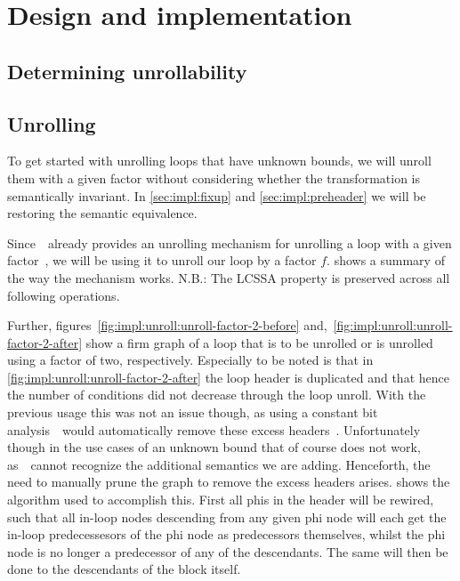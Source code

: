 \chapter{Design and implementation}\label{sec:impl}

\section{Determining unrollability}\label{sec:impl:unrollability}

\section{Unrolling}\label{sec:impl:unroll}

To get started with unrolling loops that have unknown bounds, we will unroll them with a given factor without considering whether the transformation is semantically invariant.
In \cref{sec:impl:fixup} and \cref{sec:impl:preheader} we will be restoring the semantic equivalence.

Since~\libFIRM~already provides an unrolling mechanism for unrolling a loop with a given factor~\cite{aebi18bachelorarbeit}, we will be using it to unroll our loop by a factor $f$.
 shows a summary of the way the mechanism works.
N.B.: The LCSSA property is preserved across all following operations.

Further, figures~\ref{fig:impl:unroll:unroll-factor-2-before} and,~\ref{fig:impl:unroll:unroll-factor-2-after} show a firm graph of a loop that is to be unrolled or is unrolled using a factor of two, respectively.
Especially to be noted is that in \cref{fig:impl:unroll:unroll-factor-2-after} the loop header is duplicated and that hence the number of conditions did not decrease through the loop unroll.
With the previous usage this was not an issue though, as using a constant bit analysis~\libFIRM~would automatically remove these excess headers~\cite{aebi18bachelorarbeit}.
Unfortunately though in the use cases of an unknown bound that of course does not work, as~\libFIRM~cannot recognize the additional semantics we are adding.
Henceforth, the need to manually prune the graph to remove the excess headers arises.
 shows the algorithm used to accomplish this.
First all phis in the header will be rewired, such that all in-loop nodes descending from any given phi node will each get the in-loop predecessesors of the phi node as predecessors themselves, whilst the phi node is no longer a predecessor of any of the descendants.
The same will then be done to the descendants of the block itself.

